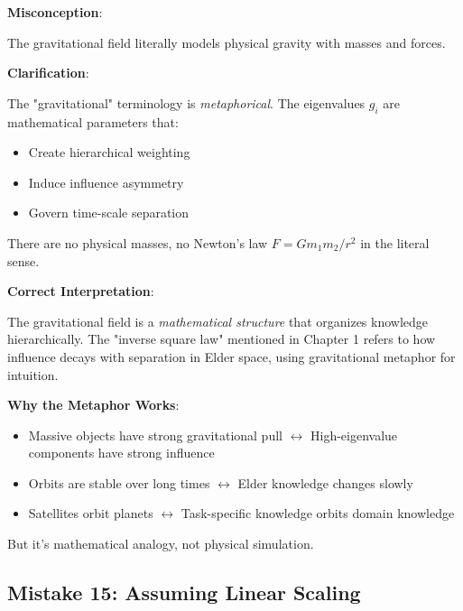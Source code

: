\begin{warning}
\textbf{Misconception}:

The gravitational field literally models physical gravity with masses and forces.

\textbf{Clarification}:

The "gravitational" terminology is \textit{metaphorical}. The eigenvalues $g_i$ are mathematical parameters that:
\begin{itemize}
\item Create hierarchical weighting
\item Induce influence asymmetry
\item Govern time-scale separation
\end{itemize}

There are no physical masses, no Newton's law $F = Gm_1m_2/r^2$ in the literal sense.

\textbf{Correct Interpretation}:

The gravitational field is a \textit{mathematical structure} that organizes knowledge hierarchically. The "inverse square law" mentioned in Chapter 1 refers to how influence decays with separation in Elder space, using gravitational metaphor for intuition.

\textbf{Why the Metaphor Works}:

\begin{itemize}
\item Massive objects have strong gravitational pull $\leftrightarrow$ High-eigenvalue components have strong influence
\item Orbits are stable over long times $\leftrightarrow$ Elder knowledge changes slowly
\item Satellites orbit planets $\leftrightarrow$ Task-specific knowledge orbits domain knowledge
\end{itemize}

But it's mathematical analogy, not physical simulation.
\end{warning}

\subsection{Mistake 15: Assuming Linear Scaling}

